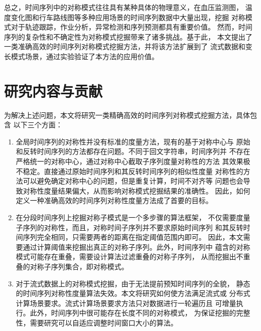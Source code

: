 总之，时间序列中的对称模式往往具有某种具体的物理意义，在血压监测图，
温度变化图和行车路线图等多种应用场景的时间序列数据中大量出现，挖掘
对称模式对于轨迹跟踪，作业分析，异常检测和序列预测都具有重要价值。
然而，时间序列的复杂性和不确定性为对称模式挖掘带来了诸多挑战。基于此，
本文提出了一类准确高效的时间序列对称模式挖掘方法，并将该方法扩展到了
流式数据和变长模式场景，通过实验验证了本方法的应用价值。


\section{研究内容与贡献}
为解决上述问题，本文将研究一类精确高效的时间序列对称模式挖掘方法，具体包含
以下三个方面：
\begin{enumerate}
  \item 全局时间序列的对称性并没有标准的度量方法，现有的基于对称中心与
  原始和反转时间序列的方法都存在问题。不同于回文字符串，时间序列并
  不存在严格统一的对称中心，通过对称中心截取子序列度量对称性的方法
  其效果极不稳定。直接通过原始时间序列和其反转时间序列的相似性度量
  对称性的方法可以避免确定对称中心的问题，但是重复计算，时间不对齐等
  问题也会导致对称性度量结果偏大，从而影响对称模式挖掘结果的准确性。
  因此，如何定义一种准确高效的时间序列对称性度量方法成了首要的目标。
  \item 在分段时间序列上挖掘对称子模式是一个多步骤的算法框架，
  不仅需要度量子序列的对称性，而且，对称时间子序列并不要求原始时间序列
  和其反转时间序列完全相同，只需要两者的距离在指定阈值范围内即可。
  因此，本文需要通过计算阈值来挖掘出真正的对称子序列。此外，时间序列中
  蕴含的对称模式可能存在重叠，需要设计算法过滤重叠的对称子序列，
  从而挖掘出不重叠的对称子序列集合，即对称模式。
  \item 对于流式数据上的对称模式挖掘，由于无法提前预知时间序列的全貌，
  静态的时间序列对称性度量算法失效。本文将研究如何使方法满足流式或
  分布式计算场景要求。流式计算场景要求方法只对数据进行一轮遍历且
  可增量执行。此外，时间序列中很可能存在长度不同的对称模式，
  为保证挖掘的完整性，需要研究可以自适应调整时间窗口大小的算法。
\end{enumerate}

